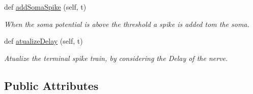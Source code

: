 \begin{DoxyCompactItemize}
def \hyperlink{class_motor_unit_1_1_motor_unit_a6d597c703b3b469fbec7843a0f97c534}{add\+Soma\+Spike} (self, t)
\begin{DoxyCompactList}\small\item\em When the soma potential is above the threshold a spike is added tom the soma. \end{DoxyCompactList}\item 
def \hyperlink{class_motor_unit_1_1_motor_unit_a0aa5e024003845e3f48bc0e618068edc}{atualize\+Delay} (self, t)
\begin{DoxyCompactList}\small\item\em Atualize the terminal spike train, by considering the Delay of the nerve. \end{DoxyCompactList}\end{DoxyCompactItemize}
\subsection*{Public Attributes}
